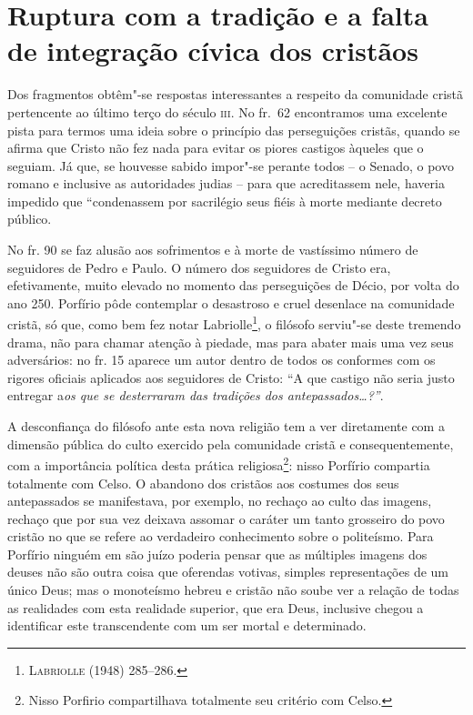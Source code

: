 \section{Ruptura com a tradição e a falta de integração cívica dos
cristãos}

Dos fragmentos obtêm"-se respostas interessantes a respeito da comunidade
cristã pertencente ao último terço do século \textsc{iii}. No fr.~62 encontramos
uma excelente pista para termos uma ideia sobre o princípio das
perseguições cristãs, quando se afirma que Cristo não fez nada para
evitar os piores castigos àqueles que o seguiam. Já que, se houvesse
sabido impor"-se perante todos – o Senado, o povo romano e inclusive as
autoridades judias – para que acreditassem nele, haveria impedido que
“condenassem por sacrilégio seus fiéis à morte mediante decreto
público. 

No fr. 90 se faz alusão aos sofrimentos e à morte de vastíssimo número
de seguidores de Pedro e Paulo. O número dos seguidores de Cristo era,
efetivamente, muito elevado no momento das perseguições de Décio, por
volta do ano 250. Porfírio pôde contemplar o desastroso e cruel
desenlace na comunidade cristã, só que, como bem fez notar
Labriolle\footnote{ \textsc{Labriolle} (1948) 285--286.}, o filósofo
serviu"-se deste tremendo drama, não para chamar atenção à piedade, mas
para abater mais uma vez seus adversários: no fr. 15 aparece um autor
dentro de todos os conformes com os rigores oficiais aplicados aos
seguidores de Cristo: “A que castigo não seria justo entregar
a\textit{os que se desterraram das tradições dos antepassados…?”}.

A desconfiança do filósofo ante esta nova religião tem a ver diretamente
com a dimensão pública do culto exercido pela comunidade cristã e
consequentemente, com a importância política desta prática
religiosa\footnote{ Nisso Porfirio compartilhava totalmente seu
critério com Celso.}: nisso Porfírio compartia totalmente com Celso. O
abandono dos cristãos aos costumes dos seus antepassados se
manifestava, por exemplo, no rechaço ao culto das imagens, rechaço que
por sua vez deixava assomar o caráter um tanto grosseiro do povo
cristão no que se refere ao verdadeiro conhecimento sobre o politeísmo.
Para Porfírio ninguém em são juízo poderia pensar que as múltiples
imagens dos deuses não são outra coisa que oferendas votivas, simples
representações de um único Deus; mas o monoteísmo hebreu e cristão não
soube ver a relação de todas as realidades com esta realidade superior,
que era Deus, inclusive chegou a identificar este transcendente com um
ser mortal e determinado. 

